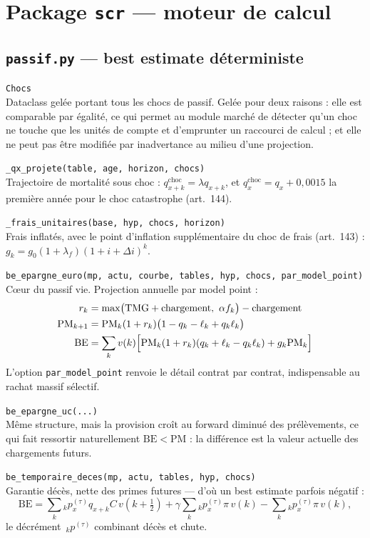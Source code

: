 \documentclass[10pt,a4paper]{article}
\newcommand{\fn}[2]{\par\smallskip\textcolor{bleufonce}{\texttt{#1}}\\ #2\par}
\newcommand{\art}[1]{\textcolor{gris}{\small (art.~#1)}}
\begin{document}
\section{Package \texttt{scr} — moteur de calcul}

\subsection{\texttt{passif.py} — best estimate déterministe}

\fn{Chocs}{Dataclass gelée portant tous les chocs de passif. Gelée pour deux raisons : elle est
comparable par égalité, ce qui permet au module marché de détecter qu'un choc ne touche que les
unités de compte et d'emprunter un raccourci de calcul ; et elle ne peut pas être modifiée par
inadvertance au milieu d'une projection.}

\fn{\_qx\_projete(table, age, horizon, chocs)}{Trajectoire de mortalité sous choc :
$q^{\text{choc}}_{x+k} = \lambda q_{x+k}$, et $q^{\text{choc}}_x = q_x + 0{,}0015$ la première
année pour le choc catastrophe \art{144}.}

\fn{\_frais\_unitaires(base, hyp, chocs, horizon)}{Frais inflatés, avec le point d'inflation
supplémentaire du choc de frais \art{143} : $g_k = g_0 (1+\lambda_f)(1+i+\Delta i)^k$.}

\fn{be\_epargne\_euro(mp, actu, courbe, tables, hyp, chocs, par\_model\_point)}{Cœur du passif
vie. Projection annuelle par model point :
\begin{align*}
r_k &= \max\bigl(\mathrm{TMG} + \text{chargement},\ \alpha f_k\bigr) - \text{chargement}\\
\mathrm{PM}_{k+1} &= \mathrm{PM}_k(1+r_k)\bigl(1 - q_k - \ell_k + q_k \ell_k\bigr)\\
\mathrm{BE} &= \sum_k v(k)\Bigl[\mathrm{PM}_k(1+r_k)(q_k + \ell_k - q_k\ell_k) + g_k \mathrm{PM}_k\Bigr]
\end{align*}
L'option \texttt{par\_model\_point} renvoie le détail contrat par contrat, indispensable au
rachat massif sélectif.}

\fn{be\_epargne\_uc(...)}{Même structure, mais la provision croît au forward diminué des
prélèvements, ce qui fait ressortir naturellement $\mathrm{BE} < \mathrm{PM}$ : la différence est
la valeur actuelle des chargements futurs.}

\fn{be\_temporaire\_deces(mp, actu, tables, hyp, chocs)}{Garantie décès, nette des primes
futures — d'où un best estimate parfois négatif :
\[
\mathrm{BE} = \sum_k {}_k p^{(\tau)}_x q_{x+k} C\, v(k+\tfrac12)
+ \gamma \sum_k {}_k p^{(\tau)}_x \pi\, v(k) - \sum_k {}_k p^{(\tau)}_x \pi\, v(k),
\]
le décrément $\,_k p^{(\tau)}$ combinant décès et chute.}
\end{document}

